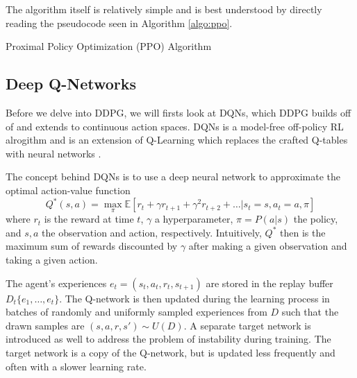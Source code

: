 The algorithm itself is relatively simple and is best understood by directly reading the pseudocode seen in Algorithm \ref{algo:ppo}.

\begin{algorithm}
	\SetAlgoLined
	\caption{Proximal Policy Optimization (PPO) Algorithm}\label{algo:ppo}
\end{algorithm}

\subsection{Deep Q-Networks}

Before we delve into DDPG, we will firsts look at DQNs, which DDPG builds off of and extends to continuous action spaces.
DQNs is a model-free off-policy RL alrogithm and is an extension of Q-Learning which replaces the crafted Q-tables with neural networks \cite{watkins1989learning,mnih2015human}.

The concept behind DQNs is to use a deep neural network to approximate the optimal action-value function
\begin{equation}
	Q^* (s, a) = \underset{\pi}{\max} \mathbb{E}\left[r_t + \gamma r_{t+1} + \gamma^2 r_{t+2} + \ldots | s_t=s, a_t=a, \pi\right]
\end{equation}
where $r_t$ is the reward at time $t$, $\gamma$ a hyperparameter, $\pi=P(a|s)$ the policy, and $s, a$ the observation and action, respectively.
Intuitively, $Q^*$ then is the maximum sum of rewards discounted by $\gamma$ after making a given observation and taking a given action.

The agent's experiences $e_t = (s_t, a_t, r_t, s_{t+1})$ are stored in the replay buffer $D_t\{e_1,\ldots,e_t\}$.
The Q-network is then updated during the learning process in batches of randomly and uniformly sampled experiences from $D$ such that the drawn samples are $(s,a,r,s') \sim U(D)$.
A separate target network is introduced as well to address the problem of instability during training.
The target network is a copy of the Q-network, but is updated less frequently and often with a slower learning rate.

